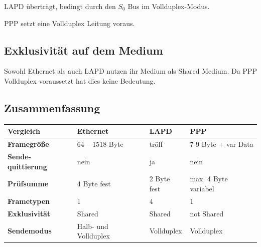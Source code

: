 \documentclass[12pt, a4paper, ngerman]{article}
\begin{document}
LAPD überträgt, bedingt durch den $S_0$ Bus im Vollduplex-Modus.

PPP setzt eine Vollduplex Leitung voraus.

\subsection{Exklusivität auf dem Medium}
Sowohl Ethernet als auch LAPD nutzen ihr Medium als Shared Medium.
Da PPP Vollduplex voraussetzt hat dies keine Bedeutung.

\subsection{Zusammenfassung}

\begin{tabular}{| m{\dimexpr.2\linewidth} || m{\dimexpr.2\linewidth} | m{\dimexpr.2\linewidth} | m{\dimexpr.2\linewidth} |}
\hline
\textbf{Vergleich} & \textbf{Ethernet} & \textbf{LAPD} & \textbf{PPP} \\ \hline \hline

\textbf{Framegröße} & 64 -- 1518 Byte & trölf & 7-9 Byte + var Data \\ \hline

\textbf{Sende-quittierung} & nein & ja & nein\\ \hline

\textbf{Prüfsumme} & 4 Byte fest & 2 Byte fest & max. 4 Byte variabel \\ \hline

\textbf{Frametypen} & 1 & 4 &  1\\ \hline

\textbf{Exklusivität} & Shared & Shared & not Shared\\ \hline

\textbf{Sendemodus} & Halb- und Vollduplex & Vollduplex & Vollduplex \\ \hline
\end{tabular}


   
\nocite{*} 

\newpage
\sloppy
\printbibliography 



\newpage
\listoffigures
\end{document}
